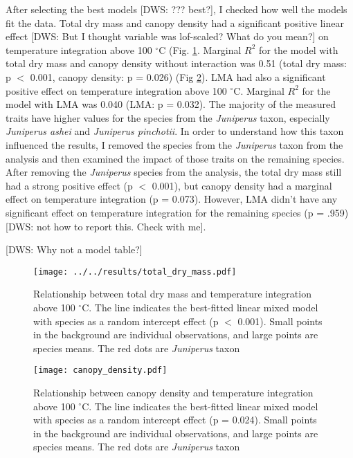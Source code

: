 \documentclass[12pt]{report}
\begin{document}
After selecting the best models [DWS: ??? best?], I checked how well the models fit the data. Total dry mass and canopy density had a significant positive linear effect [DWS: But I thought variable was lof-scaled?  What do you mean?] on temperature integration above 100 $^{\circ}$C (Fig. \ref{fig:dm-tempint}. Marginal $R^2$ for the model with total dry mass and canopy density without interaction was 0.51 (total dry mass: p $<$ 0.001, canopy density: p = 0.026) (Fig \ref{fig:canopyden-tempint}). LMA had also a significant positive effect on temperature integration above 100 $^{\circ}$C. Marginal $R^2$ for the model with LMA was 0.040 (LMA: p = 0.032). The majority of the measured traits have higher values for the species from the \emph{Juniperus} taxon, especially \emph{Juniperus ashei} and \emph{Juniperus pinchotii}. In order to understand how this taxon influenced the results, I removed the species from the \emph{Juniperus} taxon from the analysis and then examined the impact of those traits on the remaining species. After removing the \emph{Juniperus} species from the analysis, the total dry mass still had a strong positive effect (p $<$ 0.001), but canopy density had a marginal effect on temperature integration (p = 0.073). However, LMA didn't have any significant effect on temperature integration for the remaining species (p = .959) [DWS: not how to report this. Check with me].

[DWS: Why not a model table?]

\begin{figure}
    \centering
    \texttt{[image: ../../results/total\_dry\_mass.pdf]}
    \caption[Dry mass effect on temperature integration]{\label{fig:dm-tempint}Relationship between total dry mass and temperature integration above 100 $^{\circ}$C. The line indicates the best-fitted linear mixed model with species as a random intercept effect (p $<$ 0.001). Small points in the background are individual observations, and large points are species means. The red dots are \emph{Juniperus} taxon}
\end{figure}


\begin{figure}
    \centering
    \texttt{[image: canopy\_density.pdf]}
    \caption[short version]{\label{fig:canopyden-tempint} Relationship between canopy density and temperature integration above 100 $^{\circ}$C. The line indicates the best-fitted linear mixed model with species as a random intercept effect (p = 0.024). Small points in the background are individual observations, and large points are species means. The red dots are \emph{Juniperus} taxon}
\end{figure}
\end{document}
